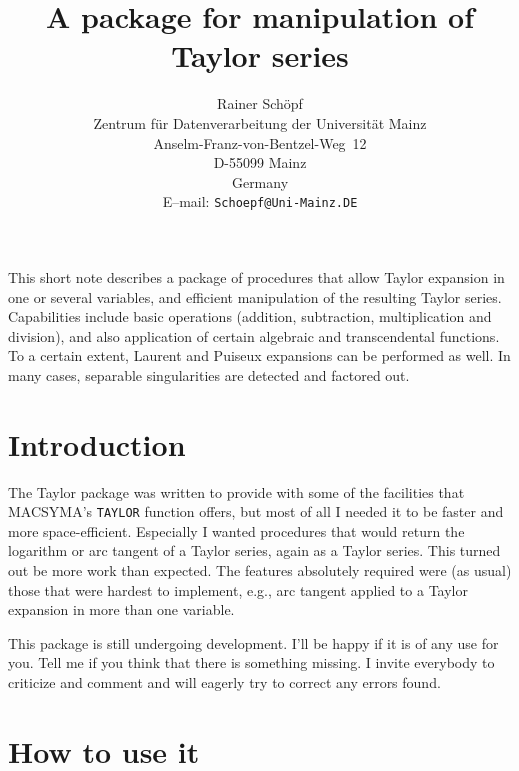 \newcommand{\MACSYMA}{{\sf MACSYMA}}
\newcommand{\MAPLE}{{\sf MAPLE}}
\newcommand{\Mathematica}{{\sf Mathematica}}
\newcommand{\PSL}{{\sf PSL}}
\title{A \REDUCE{} package for manipulation of Taylor series}
\date{}
\author{Rainer Sch\"opf\\
Zentrum f\"ur Datenverarbeitung der Universit\"at Mainz\\
Anselm-Franz-von-Bentzel-Weg~12\\
D-55099 Mainz\\
Germany\\
E--mail: {\tt Schoepf@Uni-Mainz.DE}}

\maketitle
{} 

This short note describes a package of \REDUCE{} procedures that allow
Taylor expansion in one or several variables, and efficient
manipulation of the resulting Taylor series. Capabilities include
basic operations (addition, subtraction, multiplication and division),
and also application of certain algebraic and transcendental
functions. To a certain extent, Laurent and Puiseux expansions can be
performed as well. In many cases, separable singularities are detected
and factored out.

\section{Introduction}

The Taylor package was written to provide \REDUCE{} with some of
the facilities
that \MACSYMA's \verb+TAYLOR+ function offers,
but most of all I needed it to be faster and
more space-efficient.
Especially I wanted procedures that would return the logarithm or
arc tangent of a Taylor series, again as a Taylor series.
This turned out be more work than expected. The features absolutely
required were (as usual) those that were hardest to implement,
e.g., arc tangent applied to a Taylor expansion in more than
one variable.

This package is still undergoing development.
I'll be happy if it is of any use for you.
Tell me if you think that there is something missing.
I invite everybody to criticize and comment and will eagerly try to
correct any errors found.

\section{How to use it}


